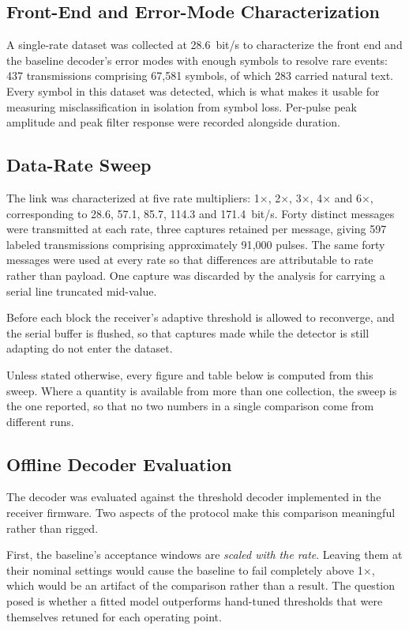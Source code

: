 \subsection{Front-End and Error-Mode Characterization}

A single-rate dataset was collected at 28.6~bit/s to characterize the front end
and the baseline decoder's error modes with enough symbols to resolve rare
events: 437 transmissions comprising 67{,}581 symbols, of which 283 carried
natural text. Every symbol in this dataset was detected, which is what makes it
usable for measuring misclassification in isolation from symbol loss. Per-pulse
peak amplitude and peak filter response were recorded alongside duration.

\subsection{Data-Rate Sweep}

The link was characterized at five rate multipliers: 1$\times$, 2$\times$,
3$\times$, 4$\times$ and 6$\times$, corresponding to 28.6, 57.1, 85.7, 114.3
and 171.4~bit/s. Forty distinct messages were transmitted at each rate, three
captures retained per message, giving 597 labeled transmissions comprising
approximately 91{,}000 pulses. The same forty messages were used at every rate
so that differences are attributable to rate rather than payload. One capture
was discarded by the analysis for carrying a serial line truncated mid-value.

Before each block the receiver's adaptive threshold is allowed to reconverge,
and the serial buffer is flushed, so that captures made while the detector is
still adapting do not enter the dataset.

Unless stated otherwise, every figure and table below is computed from this
sweep. Where a quantity is available from more than one collection, the sweep
is the one reported, so that no two numbers in a single comparison come from
different runs.

\subsection{Offline Decoder Evaluation}

The decoder was evaluated against the threshold decoder implemented in the
receiver firmware. Two aspects of the protocol make this comparison meaningful
rather than rigged.

First, the baseline's acceptance windows are \emph{scaled with the rate}.
Leaving them at their nominal settings would cause the baseline to fail
completely above 1$\times$, which would be an artifact of the comparison rather
than a result. The question posed is whether a fitted model outperforms
hand-tuned thresholds that were themselves retuned for each operating point.

